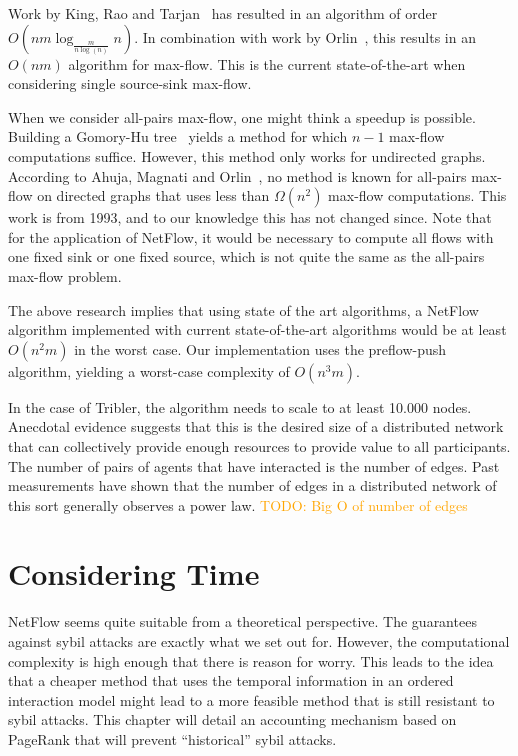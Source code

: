 \documentclass[a4paper,11pt]{book}
\newcommand\nicetohave[1]{\textcolor{orange}{TODO: #1}}
\theoremstyle{definition}
\begin{document}
Work by King, Rao and Tarjan~\cite{king1992faster} has resulted in an algorithm of
order $O(nm\log_{\frac{m}{n\log(n)}}n)$. In combination with work by Orlin~\cite{orlin2013max},
this results in an $O(nm)$ algorithm for max-flow. This is the current state-of-the-art
when considering single source-sink max-flow.

When we consider all-pairs max-flow, one might think a speedup is possible. 
Building a Gomory-Hu tree~\cite{gomory1961multi} yields a method
for which $n-1$ max-flow computations suffice. However, this method only works for undirected graphs.
According to Ahuja, Magnati and Orlin~\cite{ahuja1993network}, no method is known for all-pairs max-flow
on directed graphs that uses less than $\Omega(n^2)$ max-flow computations. This work is from
1993, and to our knowledge this has not changed since. Note that for the application of
NetFlow, it would be necessary to compute all flows with one fixed sink or one fixed source,
which is not quite the same as the all-pairs max-flow problem.

The above research implies that using state of the art algorithms, a NetFlow algorithm
implemented with current state-of-the-art algorithms would be at least $O(n^2m)$ in the
worst case. Our implementation uses the preflow-push algorithm, yielding a worst-case
complexity of $O(n^3m)$. 

In the case of Tribler, the algorithm needs to scale to at least 10.000 nodes. Anecdotal
evidence suggests that this is the desired size of a distributed network that can collectively
provide enough resources to provide value to all participants. The number of pairs of agents
that have interacted is the number of edges. Past measurements have shown that the number
of edges in a distributed network of this sort generally observes a power law. 
\nicetohave{Big O of number of edges}




\chapter{Considering Time}
\label{chap:temporal_pr}

NetFlow seems quite suitable from a theoretical perspective. The guarantees against sybil 
attacks are exactly what we set out for. However, the computational complexity is high
enough that there is reason for worry. This leads to the idea that a cheaper method that uses
the temporal information in an ordered interaction model might lead to a more feasible method
that is still resistant to sybil attacks. This chapter will detail an accounting mechanism
based on PageRank that will prevent ``historical'' sybil attacks.
\end{document}
